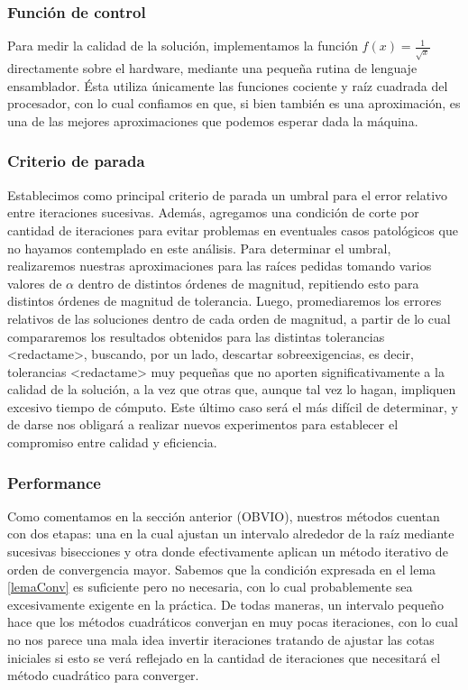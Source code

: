 	\subsubsection{Función de control}
Para medir la calidad de la solución, implementamos la función $f(x) = \frac{1}{\sqrt{x}}$ directamente sobre el hardware, mediante una pequeña rutina de lenguaje ensamblador. Ésta utiliza únicamente las funciones cociente y raíz cuadrada del procesador, con lo cual confiamos en que, si bien también es una aproximación, es una de las mejores aproximaciones que podemos esperar dada la máquina.

	\subsubsection{Criterio de parada}
Establecimos como principal criterio de parada un umbral para el error relativo entre iteraciones sucesivas. Además, agregamos una condición de corte por cantidad de iteraciones para evitar problemas en eventuales casos patológicos que no hayamos contemplado en este análisis. Para determinar el umbral, realizaremos nuestras aproximaciones para las raíces pedidas tomando varios valores de $\alpha$ dentro de distintos órdenes de magnitud, repitiendo esto para distintos órdenes de magnitud de tolerancia. Luego, promediaremos los errores relativos de las soluciones dentro de cada orden de magnitud, a partir de lo cual compararemos los resultados obtenidos para las distintas tolerancias <redactame>, buscando, por un lado, descartar sobreexigencias, es decir, tolerancias <redactame> muy pequeñas que no aporten significativamente a la calidad de la solución, a la vez que otras que, aunque tal vez lo hagan, impliquen excesivo tiempo de cómputo. Este último caso será el más difícil de determinar, y de darse nos obligará a realizar nuevos experimentos para establecer el compromiso entre calidad y eficiencia.

	\subsubsection{Performance}
Como comentamos en la sección anterior (OBVIO), nuestros métodos cuentan con dos etapas: una en la cual ajustan un intervalo alrededor de la raíz mediante sucesivas bisecciones y otra donde efectivamente aplican un método iterativo de orden de convergencia mayor. Sabemos que la condición expresada en el lema \ref{lemaConv} es suficiente pero no necesaria, con lo cual probablemente sea excesivamente exigente en la práctica. De todas maneras, un intervalo pequeño hace que los métodos cuadráticos converjan en muy pocas iteraciones, con lo cual no nos parece una mala idea invertir iteraciones tratando de ajustar las cotas iniciales si esto se verá reflejado en la cantidad de iteraciones que necesitará el método cuadrático para converger.

